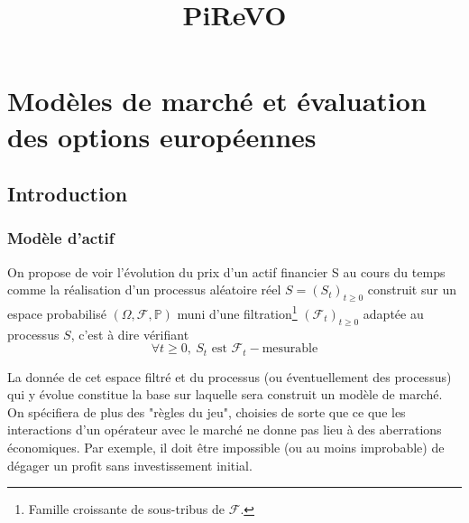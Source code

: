 \documentclass[a4paper]{book}
\title{PiReVO}
\author{}
\begin{document}
\maketitle
\tableofcontents
\part{Modèles de marché et évaluation des options européennes}
\chapter{Introduction}
\section{Modèle d'actif}
On propose de voir l'évolution du prix d'un actif financier S au cours du temps comme la réalisation d'un processus aléatoire réel $S=(S_t)_{t\geq0}$ construit sur un espace probabilisé $(\Omega,\mathcal{F},\mathbb{P})$ muni d'une filtration\footnote{Famille croissante de sous-tribus de $\mathcal{F}$.} $(\mathcal{F}_t)_{t\geq0}$ adaptée au processus $S$, c'est à dire vérifiant
\[\forall t\geq0,\ S_t \text{ est } \mathcal{F}_t-\text{mesurable} \]

La donnée de cet espace filtré et du processus (ou éventuellement des processus)
qui y évolue constitue la base sur laquelle sera construit un modèle de marché.
On spécifiera de plus des "règles du jeu", choisies de sorte que ce que les
interactions d'un opérateur avec le marché ne donne pas lieu à des aberrations
économiques. Par exemple, il doit être impossible (ou au moins improbable) de
dégager un profit sans investissement initial.
\end{document}
